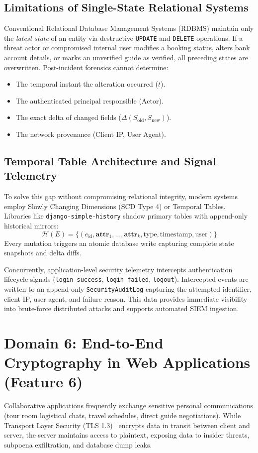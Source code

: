 \documentclass[10pt,twocolumn,a4paper]{article}
\begin{document}
\subsection{Limitations of Single-State Relational Systems}
Conventional Relational Database Management Systems (RDBMS) maintain only the \textit{latest state} of an entity via destructive \texttt{UPDATE} and \texttt{DELETE} operations. If a threat actor or compromised internal user modifies a booking status, alters bank account details, or marks an unverified guide as verified, all preceding states are overwritten. Post-incident forensics cannot determine:
\begin{itemize}[leftmargin=*]
    \item The temporal instant the alteration occurred ($t$).
    \item The authenticated principal responsible ($\text{Actor}$).
    \item The exact delta of changed fields ($\Delta(S_{\text{old}}, S_{\text{new}})$).
    \item The network provenance (Client IP, User Agent).
\end{itemize}

\subsection{Temporal Table Architecture and Signal Telemetry}
To solve this gap without compromising relational integrity, modern systems employ Slowly Changing Dimensions (SCD Type 4) or Temporal Tables. Libraries like \texttt{django-simple-history} shadow primary tables with append-only historical mirrors:
\begin{equation}
\mathcal{H}(E) = \{ (e_{\text{id}}, \mathbf{attr}_1, \dots, \mathbf{attr}_k, \text{type}, \text{timestamp}, \text{user}) \}
\end{equation}
Every mutation triggers an atomic database write capturing complete state snapshots and delta diffs.

Concurrently, application-level security telemetry intercepts authentication lifecycle signals (\texttt{login\_success}, \texttt{login\_failed}, \texttt{logout}). Intercepted events are written to an append-only \texttt{SecurityAuditLog} capturing the attempted identifier, client IP, user agent, and failure reason. This data provides immediate visibility into brute-force distributed attacks and supports automated SIEM ingestion.

\section{Domain 6: End-to-End Cryptography in Web Applications (Feature 6)}
Collaborative applications frequently exchange sensitive personal communications (tour room logistical chats, travel schedules, direct guide negotiations). While Transport Layer Security (TLS 1.3)~\cite{diffie1976new} encrypts data in transit between client and server, the server maintains access to plaintext, exposing data to insider threats, subpoena exfiltration, and database dump leaks.
\end{document}
